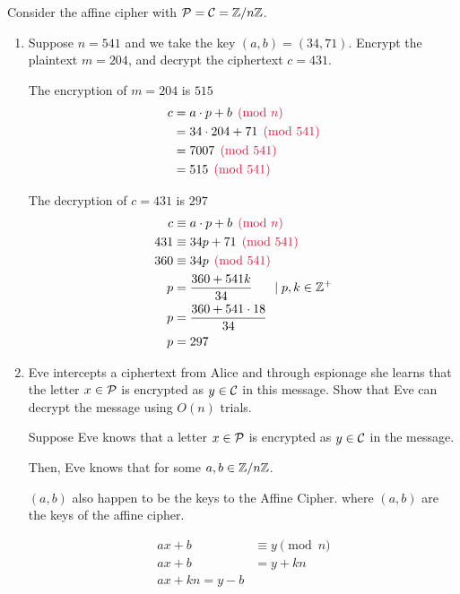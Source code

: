 \begin{problem}
Consider the affine cipher with $\mathcal{P}=\mathcal{C}=\mathbb{Z}/n\mathbb{Z}$.  
\begin{enumerate}\renewcommand{\itemsep}{3mm}
\item Suppose $n=541$ and we take the key $(a,b)=(34,71)$.  Encrypt the plaintext $m=204$, and decrypt the ciphertext $c=431$.
\begin{Answer}

\noindent
The encryption of $m=204$ is $515$
\begin{align*}
  c &= a \cdot p + b \crim{\pmod n}\\
  &= 34 \cdot 204 + 71 \crim{\pmod{541}}\\
  &= 7007 \crim{\pmod{541}}\\
  &= 515 \crim{\pmod{541}}
\end{align*}

\noindent
The decryption of $c=431$ is $297$
\begin{align*}
  c &\equiv a \cdot p + b \crim{\pmod n}\\
  431 &\equiv 34p + 71 \crim{\pmod{541}}\\
  360 &\equiv 34p \crim{\pmod{541}}\\
  p &= \frac{360 + 541k}{34}  \hspace{15pt}\mid p,k \in \Z^+\\
  p &= \frac{360 + 541\cdot 18}{34}\\
  p &= 297
\end{align*}

\end{Answer}

\item Eve intercepts a ciphertext from Alice
and through espionage she learns that the letter
$x \in \mathcal{P}$ is encrypted as $y \in \mathcal{C}$ in this message.
Show that Eve can decrypt the message using $O(n)$ trials.  
\begin{Answer}

Suppose Eve knows that a letter $x \in \mathcal{P}$ is encrypted as
$y \in \mathcal{C}$ in the message.

\noindent
Then, Eve knows that  for some $a, b \in \mathbb{Z}/n\mathbb{Z}$.

\noindent $(a, b)$ also happen to be the keys to the Affine Cipher.
where $(a, b)$ are the keys of the affine cipher.

\begin{align*}
  ax + b &\equiv y \pmod n\\
  ax + b &= y + kn\\
  ax + kn = y - b\\
\end{align*}


\end{Answer}
\end{enumerate}
\end{problem}
